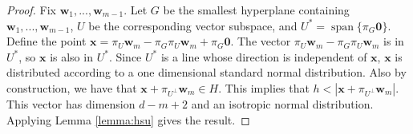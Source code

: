 \documentclass{article}
\theoremstyle{definition}
\DeclareMathOperator*{\vecspan}{span}
\newcommand{\proj}[1]{\ensuremath{\pi}_{#1}}
\newcommand{\trans}[1]{\ensuremath{{#1}^{\mathsf{T}}}}
\newcommand{\comp}[1]{\ensuremath{{#1}^\bot}}
\newcommand{\zero}{\mathbf{0}}
\newcommand{\w}{\mathbf{w}}
\newcommand{\x}{\mathbf{x}}
\newcommand{\uu}{\mathbf{u}}
\begin{document}
\begin{proof}
Fix $\w_1,...,\w_{m-1}$.
Let $G$ be the smallest hyperplane containing $\w_1,...,\w_{m-1}$,
$U$ be the corresponding vector subspace,
and $U^* = \vecspan\{\proj{G}\zero\}$.
Define the point $\x = \proj{U}\w_m - \proj{G}\proj{U}\w_m+ \proj{G}\zero$.
The vector $\proj{U}\w_m - \proj{G}\proj{U}\w_m$ is in $U^*$,
so $\x$ is also in $U^*$.
Since $U^*$ is a line whose direction is independent of $\x$,
$\x$ is distributed according to a one dimensional standard normal distribution.
Also by construction, we have that $\x+\proj{\comp U}\w_m \in H$.
This implies that $h < |\x + \proj{\comp U}\w_m|$.
This vector has dimension $d - m + 2$ and an isotropic normal distribution.
Applying Lemma \ref{lemma:hsu} gives the result.


\end{proof}
\end{document}
